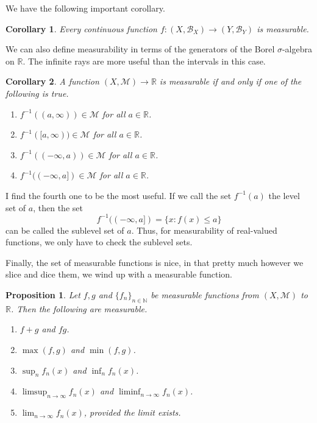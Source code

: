 \documentclass[12pt]{amsart}         %
\newtheorem{proposition}{Proposition}[section]
\newtheorem{corollary}{Corollary}[section]
\theoremstyle{remark}
\newcommand{\R}{\mathbb{R}}
\begin{document}
We have the following important corollary.

\begin{corollary}
Every continuous function $f: (X,\mathcal{B}_X) \rightarrow (Y,\mathcal{B}_Y)$ is measurable.
\end{corollary}

We can also define measurability in terms of the generators of the Borel $\sigma$-algebra on $\R$. The infinite rays are more useful than the intervals in this case.

\begin{corollary}
A function $(X,\mathcal{M}) \rightarrow \R$ is measurable if and only if one of the following is true.
\begin{enumerate}
    \item $f^{-1}((a,\infty)) \in \mathcal{M}$ for all $a \in \R$.
    \item $f^{-1}([a,\infty)) \in \mathcal{M}$ for all $a \in \R$.
    \item $f^{-1}((-\infty,a)) \in \mathcal{M}$ for all $a \in \R$.
    \item $f^{-1}((-\infty,a]) \in \mathcal{M}$ for all $a \in \R$.
\end{enumerate}
\end{corollary}

I find the fourth one to be the most useful. If we call the set $f^{-1}(a)$ the level set of $a$, then the set 
\[
f^{-1}((-\infty,a]) = \{ x : f(x) \leq a \}
\]
can be called the sublevel set of $a$. Thus, for measurability of real-valued functions, we only have to check the sublevel sets.

Finally, the set of measurable functions is nice, in that pretty much however we slice and dice them, we wind up with a measurable function.

\begin{proposition}
Let $f, g$ and $\{ f_n \}_{n \in \mathbb{N}}$ be measurable functions from $(X, \mathcal{M})$ to $\R$. Then the following are measurable.
\begin{enumerate}
\item $f + g$ and $fg$.
\item $\max(f, g)$ and $\min(f, g)$.
\item $\sup_n f_n(x)$ and $\inf_n f_n(x)$.
\item $\limsup_{n\rightarrow\infty} f_n(x)$ and $\liminf_{n\rightarrow\infty} f_n(x)$.
\item $\lim_{n\rightarrow\infty} f_n(x)$, provided the limit exists.
\end{enumerate}
\end{proposition}
\end{document}
